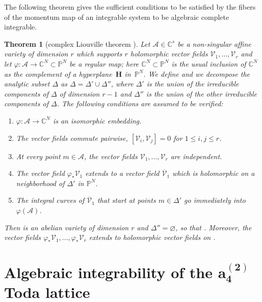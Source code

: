 \documentclass[pdftex]{sigma}
\numberwithin{equation}{section}
\newtheorem{Theorem}{Theorem}[section]
\begin{document}
The following theorem gives the sufficient conditions to be
satisfied by the fibers of the momentum map of an integrable system
to be algebraic complete integrable.
\begin{Theorem}[complex Liouville theorem {\cite{al_Moer3}}]\label{liouville}
Let $\mathcal{A} \in \mathbb{C}^s$ be a non-singular affine
variety of dimension $r$ which supports $r$ holomorphic vector
fields $\mathcal{V}_1,\dots,\mathcal{V}_r$ and let
$\varphi\colon \mathcal{A}\longrightarrow \mathbb{C}^N\subset
\mathbb{P}^N$ be a regular map; here $\mathbb{C}^N\subset
\mathbb{P}^N$ is the usual inclusion of $\mathbb{C}^N$ as the
complement of a hyperplane~$\mathbf{H}$ in~$\mathbb{P}^N$. We
define  and we decompose the analytic
subset $\Delta$ as $\Delta=\Delta'\cup \Delta''$, where
$\Delta'$ is the union of the irreducible components of $\Delta$
of dimension $r-1$ and $\Delta''$ is the union of the other
irreducible components of $\Delta$. The following conditions are
assumed to be verified:
\begin{enumerate}\itemsep=0pt
\item[$1.$] $\varphi\colon \mathcal{A}\longrightarrow \mathbb{C}^N$ is an isomorphic embedding.
 \item[$2.$] The vector fields commute pairwise,
$[\mathcal{V}_i,\mathcal{V}_j]=0$ for $1\leq i,j \leq r$.
 \item[$3.$] At every point $m\in \mathcal{A}$, the vector fields
$\mathcal{V}_1,\dots,\mathcal{V}_r$ are independent.
 \item[$4.$] The vector field $\varphi_{\ast}\mathcal{V}_1$
extends to a vector field $\overline{\mathcal{V}}_1$ which is
holomorphic on a neighborhood of $\Delta'$ in $\mathbb{P}^N$.
 \item[$5.$] The integral curves of $\overline{\mathcal{V}}_1$ that start at points $m\in \Delta'$ go immediately
into $\varphi (\mathcal{A} )$.
\end{enumerate}
Then  is an abelian
variety of dimension $r$ and $\Delta''=\varnothing$, so that
. Moreover, the vector fields $\varphi_{
\ast}\mathcal{V}_1,\dots,\varphi_{\ast}\mathcal{V}_r$ extends to
holomorphic vector fields on
.
\end{Theorem}


\section[Algebraic integrability of the a\_4\^{}(2) Toda lattice]{Algebraic integrability of the $\boldsymbol{a_4^{(2)}}$ Toda lattice}\label{sec3}
\end{document}
